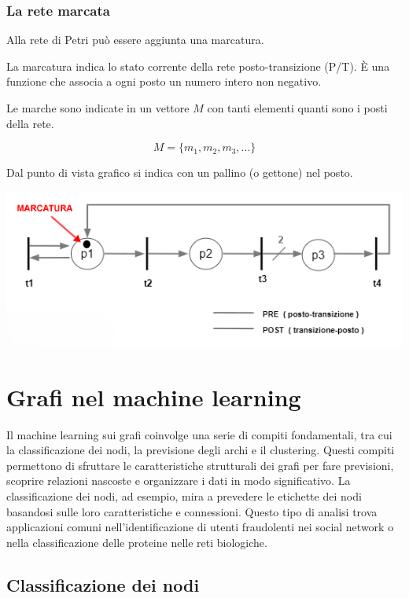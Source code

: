 \documentclass{article}
\begin{document}
\subsubsection{La rete marcata}

Alla rete di Petri può essere aggiunta una marcatura.

La marcatura indica lo stato corrente della rete posto-transizione (P/T). È una funzione che associa a ogni posto un numero intero non negativo.

Le marche sono indicate in un vettore $M$ con tanti elementi quanti sono i posti della rete.

\[
M = \{ m_1, m_2, m_3, ... \}
\]

Dal punto di vista grafico si indica con un pallino (o gettone) nel posto.\\
\begin{center}
    \includegraphics{imgGrafi/marcatura-rete-petri-esempio.png}
\end{center}


\section{Grafi nel machine learning}

Il machine learning sui grafi coinvolge una serie di compiti fondamentali, tra cui la classificazione dei nodi, la previsione degli archi e il clustering. Questi compiti permettono di sfruttare le caratteristiche strutturali dei grafi per fare previsioni, scoprire relazioni nascoste e organizzare i dati in modo significativo. La classificazione dei nodi, ad esempio, mira a prevedere le etichette dei nodi basandosi sulle loro caratteristiche e connessioni. Questo tipo di analisi trova applicazioni comuni nell'identificazione di utenti fraudolenti nei social network o nella classificazione delle proteine nelle reti biologiche.

\subsection{Classificazione dei nodi}
\end{document}
